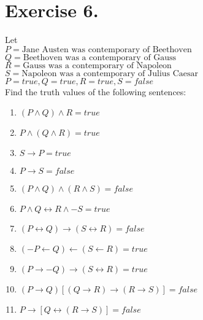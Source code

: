 \documentclass{article}
\begin{document}
\section*{Exercise 6.}
Let\\
$P = \text{Jane Austen was contemporary of Beethoven}$\\
$Q = \text{Beethoven was a contemporary of Gauss}$\\
$R = \text{Gauss was a contemporary of Napoleon}$\\
$S = \text{Napoleon was a contemporary of Julius Caesar}$\\
$P = true, Q = true, R = true, S = false$ \\
Find the truth values of the following sentences:
\medskip
\begin{enumerate}[label=(\alph*)]
\item $(P \wedge Q) \wedge R = true$
\item $P \wedge (Q \wedge R) = true$
\item $S \rightarrow P = true$
\item $P \rightarrow S = false$
\item $(P \wedge Q) \wedge (R \wedge S) = false$
\item $P \wedge Q \leftrightarrow R \wedge -S = true$
\item $(P \leftrightarrow Q) \rightarrow (S \leftrightarrow R) = false$
\item $(-P \leftarrow Q) \leftarrow (S \leftarrow R) = true$
\item $(P \rightarrow -Q) \rightarrow (S \leftrightarrow R) = true$
\item $(P \rightarrow Q) [(Q \rightarrow R) \rightarrow (R \rightarrow S)] = false$
\item $P \rightarrow [Q \leftrightarrow (R \rightarrow S)] = false$
\end{enumerate}
\end{document}
